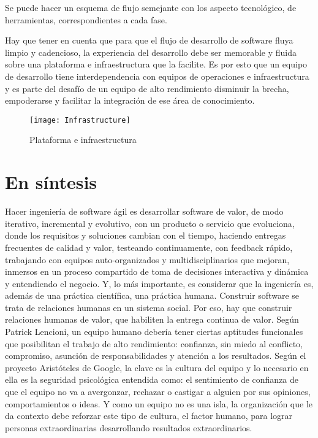 Se puede hacer un esquema de flujo semejante con los aspecto tecnológico, de herramientas, correspondientes a cada fase.

Hay que tener en cuenta que para que el flujo de desarrollo de software fluya limpio y cadencioso, la experiencia del desarrollo debe ser memorable y fluida sobre una plataforma e infraestructura que la facilite. Es por esto que un equipo de desarrollo tiene interdependencia con equipos de operaciones e infraestructura y es parte del desafío de un equipo de alto rendimiento disminuir la brecha, empoderarse y facilitar la integración de ese área de conocimiento.

\begin{figure}[h]
  \centering
  \texttt{[image: Infrastructure]}
  \caption{Plataforma e infraestructura}
  \centering
  \label{fig:Infrastructure} %
\end{figure}
\FloatBarrier %

\section{En síntesis}

Hacer ingeniería de software ágil es desarrollar software de valor, de modo iterativo, incremental y evolutivo, con un producto o servicio que evoluciona, donde los requisitos y soluciones cambian con el tiempo, haciendo entregas frecuentes de calidad y valor, testeando continuamente, con feedback rápido, trabajando con equipos auto-organizados y multidisciplinarios que mejoran, inmersos en un proceso compartido de toma de decisiones interactiva y dinámica y entendiendo el negocio. Y, lo más importante, es considerar que la ingeniería es, además de una práctica científica, una práctica humana. Construir software se trata de relaciones humanas en un sistema social. Por eso, hay que construir relaciones humanas de valor, que habiliten la entrega continua de valor. Según Patrick Lencioni, un equipo humano debería tener ciertas aptitudes funcionales que posibilitan el trabajo de alto rendimiento: confianza, sin miedo al conflicto, compromiso, asunción de responsabilidades y atención a los resultados. Según el proyecto Aristóteles de Google, la clave es la cultura del equipo y lo necesario en ella es la seguridad psicológica entendida como: el sentimiento de confianza de que el equipo no va a avergonzar, rechazar o castigar a alguien por sus opiniones, comportamientos o ideas. Y como un equipo no es una isla, la organización que le da contexto debe reforzar este tipo de cultura, el factor humano, para lograr personas extraordinarias desarrollando resultados extraordinarios.

